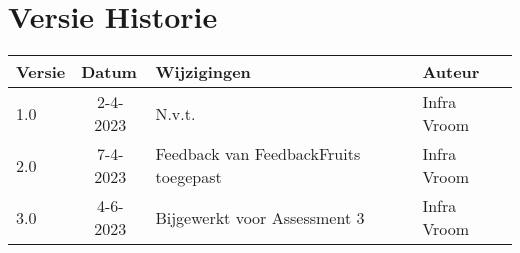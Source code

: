 \section*{Versie Historie} 

\begin{table}[h]
\begin{tabular}{|l|l|l|l|}
\hline
\rowcolor[HTML]{4472C4} 
{\color[HTML]{FFFFFF} \textbf{Versie}} &
  {\color[HTML]{FFFFFF} \textbf{Datum}} &
  {\color[HTML]{FFFFFF} \textbf{Wijzigingen}} &
  {\color[HTML]{FFFFFF} \textbf{Auteur}} \\ \hline
\rowcolor[HTML]{D9E1F2} 
1.0 &
  \multicolumn{1}{c|}{\cellcolor[HTML]{D9E1F2}2-4-2023} &
 N.v.t. &
  Infra   Vroom \\ \hline

\rowcolor[HTML]{FFFFFF} 
2.0 &
  \multicolumn{1}{c|}{\cellcolor[HTML]{FFFFFF}7-4-2023} &
 Feedback van FeedbackFruits toegepast &
  Infra   Vroom \\ \hline

\rowcolor[HTML]{D9E1F2} 
3.0 &
  \multicolumn{1}{c|}{\cellcolor[HTML]{D9E1F2}4-6-2023} &
 Bijgewerkt voor Assessment 3 &
  Infra   Vroom \\ \hline

\end{tabular}
\end{table}